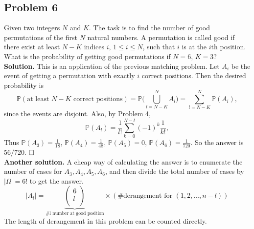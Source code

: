 \documentclass[12pt]{article}
\begin{document}
\subsection*{Problem 6} Given two integers $N$ and $K$. The task is to find the number of good permutations of the first $N$ natural numbers. A permutation is called good if there exist at least $N-K$ indices $i,\,1\leq i\leq N$, such that $i$ is at the $i$th position. What is the probability of getting good permutations if $N= 6,\, K=3$?
\\
\textbf{Solution.} This is an application of the previous matching problem. Let $A_i$ be the event of getting a permutation with exactly $i$ correct positions. Then the desired probability is
\begin{equation*}
\mathbb{P}(\text{at least $N-K$ correct positions})=\mathbb{P}\Big(\bigcup_{l=N-K}^NA_{l}\Big)=\sum_{l=N-K}^N\mathbb{P}(A_l),
\end{equation*}
since the events are disjoint. Also, by Problem 4, 
\begin{equation*}
\mathbb{P}(A_{l})=\frac{1}{l!}\sum_{k=0}^{N-l}(-1)^k\frac{1}{k!},
\end{equation*}
Thus $\mathbb{P}(A_3)=\frac{1}{18}$, $\mathbb{P}(A_4)=\frac{1}{48}$, $\mathbb{P}(A_5)=0$, $\mathbb{P}(A_6)=\frac{1}{720}$. So the answer is $56/720$.
$\hspace{\fill}\square$
\hspace{1 \textwidth}
\\ \textbf{Another solution.} 
A cheap way of calculating the answer is to enumerate the number of cases for $A_3, A_4, A_5, A_6$, and then divide the total number of cases by $|\Omega| = 6! $ to get the answer. 
\[
    |A_l| = \underbrace{\begin{pmatrix}
         6 \\
         l \\
    \end{pmatrix} }_{\# \text{l number at good position} }\times (\# \text{derangement for }  (1,2,\dots, n-l))
\]
The length of derangement in this problem can be counted directly.
\\ \\
\end{document}
